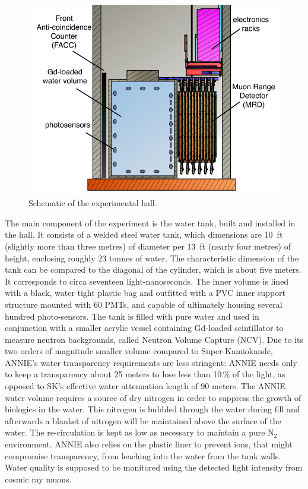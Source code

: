 \begin{figure}
  \centering
  \includegraphics[scale=0.25]{pics/ANNIEreduced2}
  \caption{Schematic of the experimental hall.}
  \label{fig:anniehall}
\end{figure}

 The main component of the experiment is the water tank, built and installed in the hall.
 It consists of a welded steel water tank, which dimensions are 10~ft (slightly more than three metres) %
 of diameter per 13~ft (nearly four metres) of height, enclosing roughly 23 tonnes of water.
 The characteristic dimension of the tank can be compared to the diagonal of the cylinder, %
 which is about five meters.
 It corresponds to circa seventeen light-nanoseconds.
 The inner volume is lined with a black, water tight plastic bag and outfitted with %
 a PVC inner support structure mounted with 60 PMTs, and capable of ultimately housing several %
 hundred photo-sensors. 
 The tank is filled with pure water and used in conjunction with a smaller %
 acrylic vessel containing Gd-loaded scintillator to measure neutron backgrounds, called %
 Neutron Volume Capture (NCV).
 Due to its two orders of magnitude smaller volume compared to Super-Kamiokande, %
 ANNIE’s water transparency requirements are less stringent: %
 ANNIE needs only to keep a transparency about 25 meters to lose less than 10\,\% of the light, %
 as opposed to SK’s effective water attenuation length of 90 meters.
 The ANNIE water volume requires a source of dry nitrogen in order to suppress the growth of %
 biologics in the water.
 This nitrogen is bubbled through the water during fill and afterwards a blanket of nitrogen %
 will be maintained above the surface of the water. 
 The re-circulation is kept as low as necessary to maintain a pure N$_2$ environment.
 ANNIE also relies on the plastic liner to prevent ions, that might compromise transparency, %
 from leaching into the water from the tank walls.
 Water quality is supposed to be monitored using the detected light intensity from cosmic ray muons.
 
